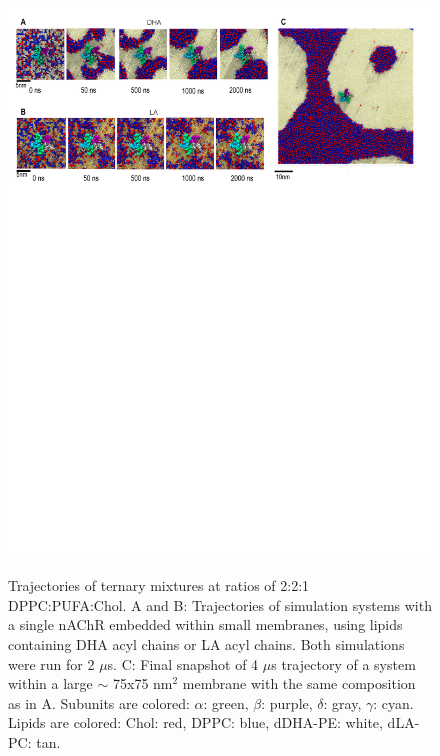 		\begin{figure}[t]
		{
		\includegraphics[width=1\linewidth]{ModelMemb_Images/Fig1.pdf}}
		\caption[Trajectories of ternary mixtures at ratios of 2:2:1 DPPC:PUFA:Chol.] {Trajectories of ternary mixtures at ratios of 2:2:1 DPPC:PUFA:Chol. A and B: Trajectories of simulation systems with a single nAChR embedded within small membranes, using lipids containing DHA acyl chains or LA acyl chains. Both simulations were run for 2 $\mu$s. C: Final snapshot of 4 $\mu$s trajectory of a system within a large $\sim$ 75x75 nm$^2$ membrane with the same composition as in A. Subunits are colored: $\alpha$: green, $\beta$: purple, $\delta$: gray, $\gamma$: cyan. Lipids are colored: Chol: red, DPPC: blue, dDHA-PE: white, dLA-PC: tan.}
		\label{fig:fig1}
	\end{figure}

